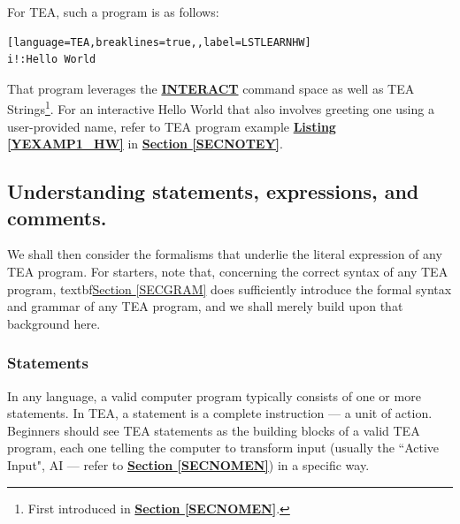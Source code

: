 \documentclass[a4paper, 18pt]{book} %
\begin{document}
{{{\begin{appendices}
\vspace{2em}

For TEA, such a program is as follows:

\vspace{2em}

  \begin{tcolorbox}[teaterminalstyle, title=LEARN PROGRAMMING: TEA Hello World, breakable]
  \begin{lstlisting}[language=TEA,breaklines=true,,label=LSTLEARNHW]
i!:Hello World
   \end{lstlisting}
  \end{tcolorbox}
\vspace{2em}

That program leverages the \textbf{\hyperref[CHAPI]{INTERACT}} command space as well as TEA Strings\footnote{First introduced in \textbf{\hyperref[SECNOMEN]{Section \ref{SECNOMEN}}}.}. For an interactive Hello World that also involves greeting one using a user-provided name, refer to TEA program example \textbf{\hyperref[YEXAMP1_HW]{Listing \ref{YEXAMP1_HW}}} in \textbf{\hyperref[SECNOTEY]{Section \ref{SECNOTEY}}}.


\subsection{Understanding statements, expressions, and comments.}


We shall then consider the formalisms that underlie the literal expression of any TEA program. For starters, note that, concerning the correct syntax of any TEA program, textbf{\hyperref[SECGRAM]{Section \ref{SECGRAM}}} does sufficiently introduce the formal syntax and grammar of any TEA program, and we shall merely build upon that background here.


\subsubsection{Statements}

In any language, a valid computer program typically consists of one or more statements. In TEA, a statement is a complete instruction — a unit of action. Beginners should see TEA statements as the building blocks of a valid TEA program, each one telling the computer to transform input (usually the ``Active Input", AI --- refer to \textbf{\hyperref[SECNOMEN]{Section \ref{SECNOMEN}}}) in a specific way.

\vspace{2em}


\end{appendices}}}}
\end{document}
